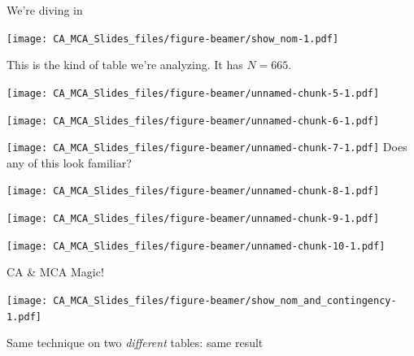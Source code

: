 \documentclass[
  ignorenonframetext,
]{beamer}
\begin{document}
\begin{frame}{We're diving in}
\protect\hypertarget{were-diving-in-1}{}

\texttt{[image: CA\_MCA\_Slides\_files/figure-beamer/show\_nom-1.pdf]}

This is the kind of table we're analyzing. It has \(N = 665\).

\end{frame}

\begin{frame}

\texttt{[image: CA\_MCA\_Slides\_files/figure-beamer/unnamed-chunk-5-1.pdf]}

\end{frame}

\begin{frame}

\texttt{[image: CA\_MCA\_Slides\_files/figure-beamer/unnamed-chunk-6-1.pdf]}

\end{frame}

\begin{frame}

\texttt{[image: CA\_MCA\_Slides\_files/figure-beamer/unnamed-chunk-7-1.pdf]}
Does any of this look familiar?

\end{frame}

\begin{frame}

\texttt{[image: CA\_MCA\_Slides\_files/figure-beamer/unnamed-chunk-8-1.pdf]}

\end{frame}

\begin{frame}

\texttt{[image: CA\_MCA\_Slides\_files/figure-beamer/unnamed-chunk-9-1.pdf]}

\end{frame}

\begin{frame}

\texttt{[image: CA\_MCA\_Slides\_files/figure-beamer/unnamed-chunk-10-1.pdf]}

\end{frame}

\begin{frame}{CA \& MCA Magic!}
\protect\hypertarget{ca-mca-magic}{}

\texttt{[image: CA\_MCA\_Slides\_files/figure-beamer/show\_nom\_and\_contingency-1.pdf]}

Same technique on two \emph{different} tables: same result

\end{frame}
\end{document}
